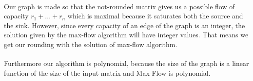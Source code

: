 \paragraph{}
Our graph is made so that the not-rounded matrix gives us a possible flow of capacity $r_1 + ... + r_n$ which is maximal because it saturates both the source and the sink. However, since every capacity of an edge of the graph is an integer, the solution given by the max-flow algorithm will have integer values. That means we get our rounding with the solution of max-flow algorithm.

\paragraph{}
Furthermore our algorithm is polynomial, because the size of the graph is a linear function of the size of the input matrix and Max-Flow is polynomial.